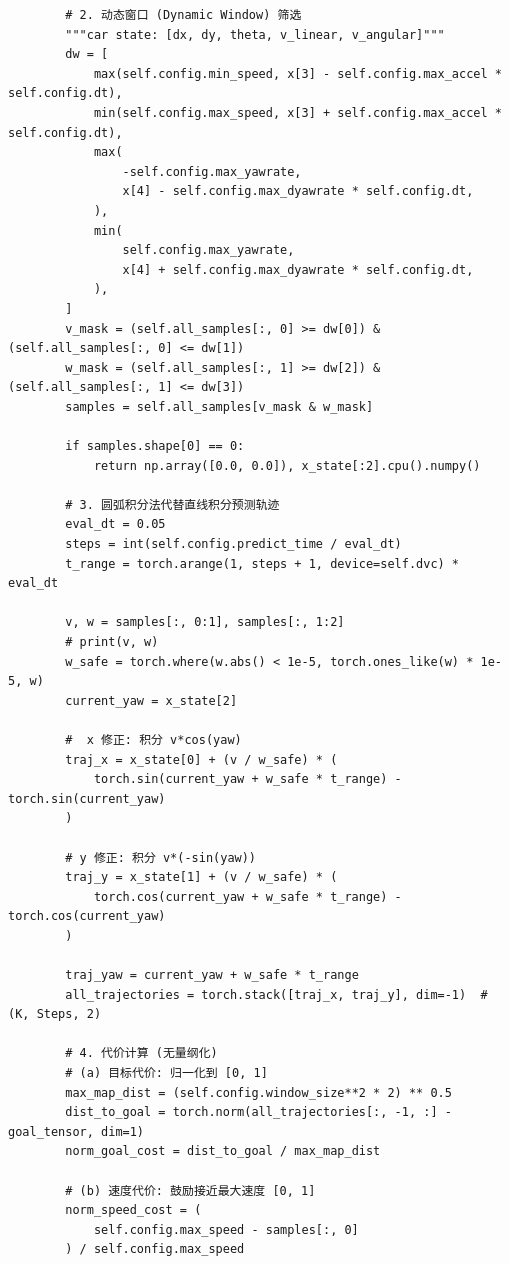 \begin{verbatim}
        # 2. 动态窗口 (Dynamic Window) 筛选
        """car state: [dx, dy, theta, v_linear, v_angular]"""
        dw = [
            max(self.config.min_speed, x[3] - self.config.max_accel * self.config.dt),
            min(self.config.max_speed, x[3] + self.config.max_accel * self.config.dt),
            max(
                -self.config.max_yawrate,
                x[4] - self.config.max_dyawrate * self.config.dt,
            ),
            min(
                self.config.max_yawrate,
                x[4] + self.config.max_dyawrate * self.config.dt,
            ),
        ]
        v_mask = (self.all_samples[:, 0] >= dw[0]) & (self.all_samples[:, 0] <= dw[1])
        w_mask = (self.all_samples[:, 1] >= dw[2]) & (self.all_samples[:, 1] <= dw[3])
        samples = self.all_samples[v_mask & w_mask]

        if samples.shape[0] == 0:
            return np.array([0.0, 0.0]), x_state[:2].cpu().numpy()

        # 3. 圆弧积分法代替直线积分预测轨迹
        eval_dt = 0.05
        steps = int(self.config.predict_time / eval_dt)
        t_range = torch.arange(1, steps + 1, device=self.dvc) * eval_dt

        v, w = samples[:, 0:1], samples[:, 1:2]
        # print(v, w)
        w_safe = torch.where(w.abs() < 1e-5, torch.ones_like(w) * 1e-5, w)
        current_yaw = x_state[2]

        #  x 修正: 积分 v*cos(yaw)
        traj_x = x_state[0] + (v / w_safe) * (
            torch.sin(current_yaw + w_safe * t_range) - torch.sin(current_yaw)
        )

        # y 修正: 积分 v*(-sin(yaw))
        traj_y = x_state[1] + (v / w_safe) * (
            torch.cos(current_yaw + w_safe * t_range) - torch.cos(current_yaw)
        )

        traj_yaw = current_yaw + w_safe * t_range
        all_trajectories = torch.stack([traj_x, traj_y], dim=-1)  # (K, Steps, 2)

        # 4. 代价计算 (无量纲化)
        # (a) 目标代价: 归一化到 [0, 1]
        max_map_dist = (self.config.window_size**2 * 2) ** 0.5
        dist_to_goal = torch.norm(all_trajectories[:, -1, :] - goal_tensor, dim=1)
        norm_goal_cost = dist_to_goal / max_map_dist

        # (b) 速度代价: 鼓励接近最大速度 [0, 1]
        norm_speed_cost = (
            self.config.max_speed - samples[:, 0]
        ) / self.config.max_speed


\end{verbatim}
